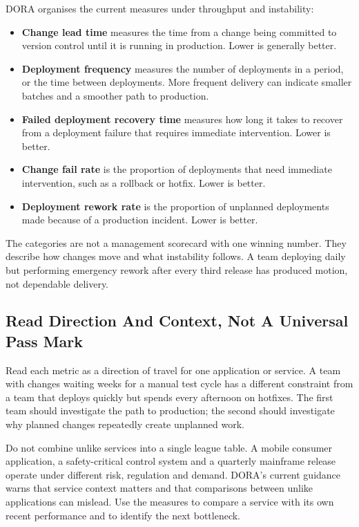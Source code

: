 DORA organises the current measures under throughput and instability:


\begin{itemize}[leftmargin=*]
\item \textbf{Change lead time} measures the time from a change being committed to version control until it is running in production. Lower is generally better.
\item \textbf{Deployment frequency} measures the number of deployments in a period, or the time between deployments. More frequent delivery can indicate smaller batches and a smoother path to production.
\item \textbf{Failed deployment recovery time} measures how long it takes to recover from a deployment failure that requires immediate intervention. Lower is better.
\item \textbf{Change fail rate} is the proportion of deployments that need immediate intervention, such as a rollback or hotfix. Lower is better.
\item \textbf{Deployment rework rate} is the proportion of unplanned deployments made because of a production incident. Lower is better.
\end{itemize}

The categories are not a management scorecard with one winning number. They describe how changes move and what instability follows. A team deploying daily but performing emergency rework after every third release has produced motion, not dependable delivery.



\subsection{Read Direction And Context, Not A Universal Pass Mark}


Read each metric as a direction of travel for one application or service. A team with changes waiting weeks for a manual test cycle has a different constraint from a team that deploys quickly but spends every afternoon on hotfixes. The first team should investigate the path to production; the second should investigate why planned changes repeatedly create unplanned work.


Do not combine unlike services into a single league table. A mobile consumer application, a safety-critical control system and a quarterly mainframe release operate under different risk, regulation and demand. DORA's current guidance warns that service context matters and that comparisons between unlike applications can mislead. Use the measures to compare a service with its own recent performance and to identify the next bottleneck. \autocite{dora-metrics}


